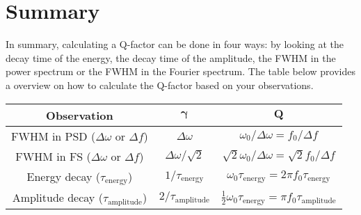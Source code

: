 \section{Summary}
In summary, calculating a Q-factor can be done in four ways: by looking at the decay time of the energy, the decay time of the amplitude, the FWHM in the power spectrum or the FWHM in the Fourier spectrum. The table below provides a overview on how to calculate the Q-factor based on your observations.

\begin{table}[h]
    \centering
    \begin{tabular}{ccc}
        \toprule
        \textbf{Observation} & $\bm{\gamma}$ & $\bm{Q}$ \\
        \midrule
        FWHM in PSD ($\Delta \omega$ or $\Delta f$) & $\Delta \omega$ & $\omega_0 / \Delta \omega = f_0 / \Delta f$ \\
        FWHM in FS ($\Delta \omega$ or $\Delta f$) & $\Delta \omega / \sqrt{2}$ & $\sqrt{2} \omega_0 / \Delta \omega = \sqrt{2} f_0 / \Delta f$ \\
        Energy decay ($\tau_\text{energy}$) & $1 / \tau_\text{energy}$ & $\omega_0 \tau_\text{energy} = 2\pi f_0 \tau_\text{energy}$ \\
        Amplitude decay ($\tau_\text{amplitude}$) & $2 / \tau_\text{amplitude}$ & $\frac{1}{2} \omega_0 \tau_\text{energy} = \pi f_0 \tau_\text{amplitude}$ \\
        \bottomrule
    \end{tabular}
\end{table}
